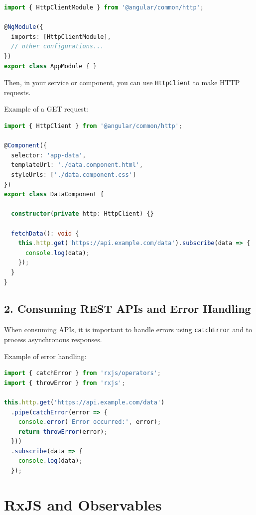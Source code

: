 \documentclass{article}
\begin{document}
\begin{lstlisting}[language=TypeScript, caption={Importing HttpClientModule}, label={lst:typescript-httpclient-import}]
import { HttpClientModule } from '@angular/common/http';

@NgModule({
  imports: [HttpClientModule],
  // other configurations...
})
export class AppModule { }
\end{lstlisting}

Then, in your service or component, you can use \texttt{HttpClient} to make HTTP requests.

Example of a GET request:
\begin{lstlisting}[language=TypeScript, caption={HTTP GET Request Example}, label={lst:typescript-httpclient-get}]
import { HttpClient } from '@angular/common/http';

@Component({
  selector: 'app-data',
  templateUrl: './data.component.html',
  styleUrls: ['./data.component.css']
})
export class DataComponent {

  constructor(private http: HttpClient) {}

  fetchData(): void {
    this.http.get('https://api.example.com/data').subscribe(data => {
      console.log(data);
    });
  }
}
\end{lstlisting}

\subsection*{2. Consuming REST APIs and Error Handling}

When consuming APIs, it is important to handle errors using \texttt{catchError} and to process asynchronous responses.

Example of error handling:
\begin{lstlisting}[language=TypeScript, caption={Error Handling in HTTP Requests}, label={lst:typescript-httpclient-error}]
import { catchError } from 'rxjs/operators';
import { throwError } from 'rxjs';

this.http.get('https://api.example.com/data')
  .pipe(catchError(error => {
    console.error('Error occurred:', error);
    return throwError(error);
  }))
  .subscribe(data => {
    console.log(data);
  });
\end{lstlisting}

\section*{RxJS and Observables}
\end{document}
